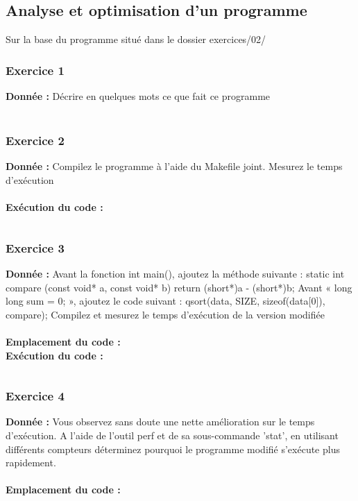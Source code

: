 \subsection{Analyse et optimisation d'un programme}
Sur	la	base	du	programme	situé	dans	le	dossier	exercices/02/
\subsubsection{Exercice 1}
\textbf{Donnée : } Décrire	en	quelques	mots	ce	que	fait	ce	programme\\\\

\subsubsection{Exercice 2}
\textbf{Donnée : } Compilez	le	programme	à	l'aide	du	Makefile	joint.
Mesurez	le	temps	d'exécution\\\\

\textbf{Exécution du code : } \\
\begin{lstlisting}

\end{lstlisting}

\subsubsection{Exercice 3}
\textbf{Donnée : } Avant	la	fonction	int	main(),	ajoutez	la	méthode	suivante :
static int compare (const void* a, const void* b)
{return (short*)a - (short*)b;}
Avant	« long	long	sum	=	0; »,	ajoutez	le	code	suivant :
qsort(data, SIZE, sizeof(data[0]), compare);
Compilez	et	mesurez	le	temps	d'exécution	de	la	version	modifiée\\\\
\textbf{Emplacement du code : } \textit{}\\

\textbf{Exécution du code : } \\
\begin{lstlisting}

\end{lstlisting}

\subsubsection{Exercice 4}
\textbf{Donnée : } Vous	observez	sans	doute	une	nette	amélioration	sur	le	temps	d'exécution.
A	l'aide	de	l'outil	perf	et	de	sa	sous-commande	'stat',	en	utilisant	différents	compteurs	déterminez	
pourquoi	le	programme	modifié	s'exécute	plus	rapidement.\\\\
\textbf{Emplacement du code : } \textit{}\\

